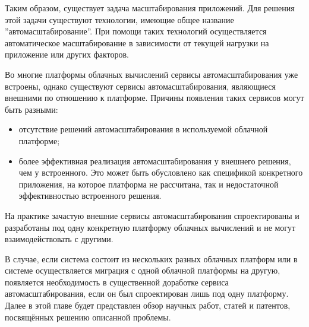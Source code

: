 Таким образом, существует задача масштабирования приложений.
Для решения этой задачи существуют технологии, имеющие общее название ''автомасштабирование''\cite{portable-autoscaler-for-managing-multi-cloud-elasticity}.
При помощи таких технологий осуществляется автоматическое масштабирование в зависимости от текущей нагрузки на приложение или других факторов.

Во многие платформы облачных вычислений сервисы автомасштабирования уже встроены\cite{portable-autoscaler-for-managing-multi-cloud-elasticity}, однако существуют сервисы автомасштабирования, являющиеся внешними по отношению к платформе.
Причины появления таких сервисов могут быть разными:
\begin{itemize}
    \item отсутствие решений автомасштабирования в используемой облачной платформе;
    \item более эффективная реализация автомасштабирования у внешнего решения, чем у встроенного.
    Это может быть обусловлено как спецификой конкретного приложения, на которое платформа не рассчитана, так и недостаточной эффективностью встроенного решения.
\end{itemize}
На практике зачастую внешние сервисы автомасштабирования спроектированы и разработаны под одну конкретную платформу облачных вычислений и не могут взаимодействовать с другими.

В случае, если система состоит из нескольких разных облачных платформ или в системе осуществляется миграция с одной облачной платформы на другую, появляется необходимость в существенной доработке сервиса автомасштабирования, если он был спроектирован лишь под одну платформу.
Далее в этой главе будет представлен обзор научных работ, статей и патентов, посвящённых решению описанной проблемы.
